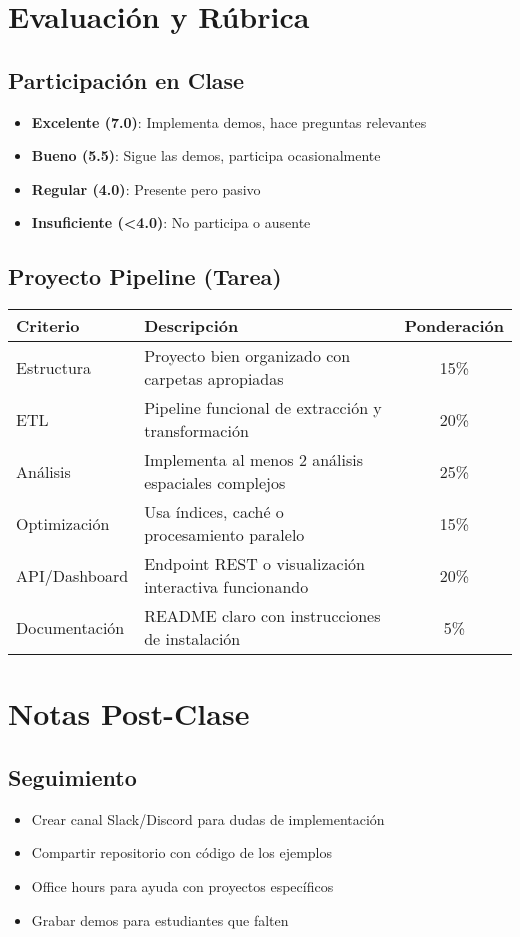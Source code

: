 \documentclass[11pt,a4paper]{article}
\begin{document}
\section{Evaluación y Rúbrica}

\subsection{Participación en Clase}
\begin{itemize}
    \item \textbf{Excelente (7.0)}: Implementa demos, hace preguntas relevantes
    \item \textbf{Bueno (5.5)}: Sigue las demos, participa ocasionalmente  
    \item \textbf{Regular (4.0)}: Presente pero pasivo
    \item \textbf{Insuficiente (<4.0)}: No participa o ausente
\end{itemize}

\subsection{Proyecto Pipeline (Tarea)}
\begin{table}[H]
\centering
\small
\begin{tabular}{|l|p{7cm}|c|}
\hline
\textbf{Criterio} & \textbf{Descripción} & \textbf{Ponderación} \\
\hline
Estructura & Proyecto bien organizado con carpetas apropiadas & 15\% \\
\hline
ETL & Pipeline funcional de extracción y transformación & 20\% \\
\hline
Análisis & Implementa al menos 2 análisis espaciales complejos & 25\% \\
\hline
Optimización & Usa índices, caché o procesamiento paralelo & 15\% \\
\hline
API/Dashboard & Endpoint REST o visualización interactiva funcionando & 20\% \\
\hline
Documentación & README claro con instrucciones de instalación & 5\% \\
\hline
\end{tabular}
\end{table}

\section{Notas Post-Clase}

\subsection{Seguimiento}
\begin{itemize}
    \item Crear canal Slack/Discord para dudas de implementación
    \item Compartir repositorio con código de los ejemplos
    \item Office hours para ayuda con proyectos específicos
    \item Grabar demos para estudiantes que falten
\end{itemize}
\end{document}

